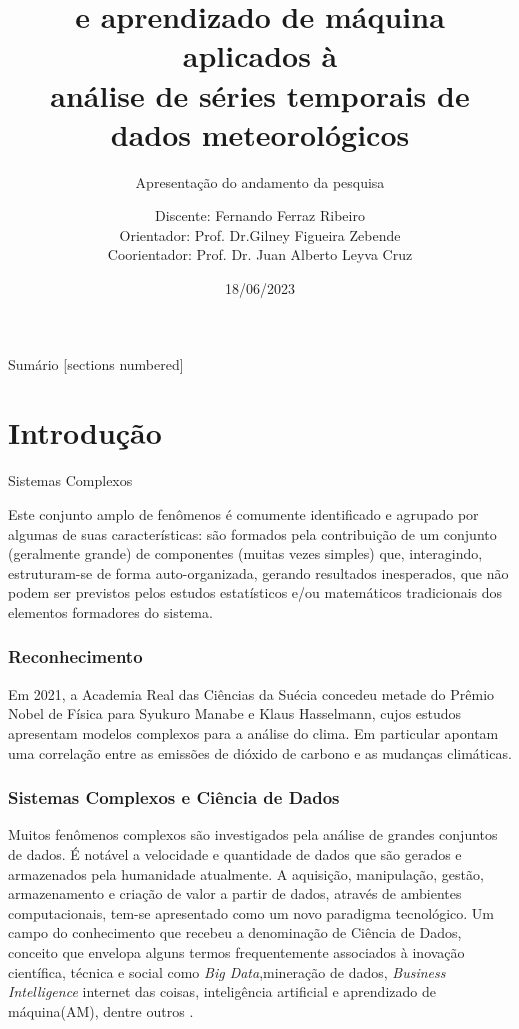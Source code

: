 \documentclass[11pt, aspectratio=169]{beamer}
\title{\dmc e aprendizado de máquina aplicados à\\análise de séries temporais de dados meteorológicos}
\subtitle{Apresentação do andamento da pesquisa}
\date{18/06/2023}
\author{Discente: Fernando Ferraz Ribeiro \\Orientador: Prof. Dr.Gilney Figueira Zebende \\Coorientador: Prof. Dr. Juan Alberto Leyva Cruz}
\institute{UEFS PPGM - Feira de Santana, BA}
\begin{document}
\maketitle

\begin{frame}{Sumário}
  [sections numbered]
  \tableofcontents[hideallsubsections]
\end{frame}

\section{Introdução}

\begin{frame}[fragile]{Sistemas Complexos}

  Este conjunto amplo de fenômenos é comumente identificado e agrupado por algumas de suas características: são formados pela contribuição de um conjunto (geralmente grande) de componentes (muitas vezes simples) que, interagindo, estruturam-se de forma auto-organizada, gerando resultados inesperados, que não podem ser previstos pelos estudos estatísticos e/ou matemáticos tradicionais dos elementos formadores do sistema.

\end{frame}

\begin{frame}
  \frametitle{Reconhecimento}

  Em 2021, a Academia Real das Ciências da Suécia concedeu metade do Prêmio Nobel de Física para Syukuro Manabe e Klaus Hasselmann, cujos estudos apresentam modelos complexos para a análise do clima. Em particular apontam uma correlação entre as emissões de dióxido de carbono e as mudanças climáticas.

\end{frame}

\begin{frame}
  \frametitle{Sistemas Complexos e Ciência de Dados}

  Muitos fenômenos complexos são investigados pela análise de grandes conjuntos de dados. É notável a velocidade e quantidade de dados que são gerados e armazenados pela humanidade atualmente. A aquisição, manipulação, gestão, armazenamento e criação de valor a partir de dados, através de ambientes computacionais, tem-se apresentado como um novo paradigma tecnológico. Um campo do conhecimento que recebeu a denominação de Ciência de Dados, conceito que envelopa alguns termos frequentemente associados à inovação científica, técnica e social como \emph{Big Data},mineração de dados, \emph{Business Intelligence} internet das coisas, inteligência artificial e aprendizado de máquina(AM), dentre outros \cite[p. 12-13]{EMCdata2015}.

\end{frame}
\end{document}
